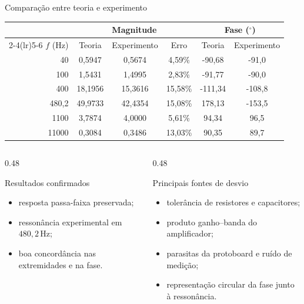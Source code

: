 \begin{frame}{Comparação entre teoria e experimento}
  \scriptsize
  \centering
  \begin{tabular}{rccccc}
    \toprule
    & \multicolumn{3}{c}{Magnitude} & \multicolumn{2}{c}{Fase ($^\circ$)} \\
    \cmidrule(lr){2-4}\cmidrule(lr){5-6}
    $f$ (Hz) & Teoria & Experimento & Erro & Teoria & Experimento \\
    \midrule
    40    & 0,5947  & 0,5674  & 4,59\%  & -90,68  & -91,0 \\
    100   & 1,5431  & 1,4995  & 2,83\%  & -91,77  & -90,0 \\
    400   & 18,1956 & 15,3616 & 15,58\% & -111,34 & -108,8 \\
    480,2 & 49,9733 & 42,4354 & 15,08\% & 178,13  & -153,5 \\
    1100  & 3,7874  & 4,0000  & 5,61\%  & 94,34   & 96,5 \\
    11000 & 0,3084  & 0,3486  & 13,03\% & 90,35   & 89,7 \\
    \bottomrule
  \end{tabular}

  \vspace{0.16cm}
  \begin{columns}[T,onlytextwidth]
    \begin{column}{0.48\textwidth}
      \begin{block}{Resultados confirmados}
        \begin{itemize}
          \item resposta passa-faixa preservada;
          \item ressonância experimental em $480{,}2\,\mathrm{Hz}$;
          \item boa concordância nas extremidades e na fase.
        \end{itemize}
      \end{block}
    \end{column}
    \begin{column}{0.48\textwidth}
      \begin{alertblock}{Principais fontes de desvio}
        \begin{itemize}
          \item tolerância de resistores e capacitores;
          \item produto ganho--banda do amplificador;
          \item parasitas da protoboard e ruído de medição;
          \item representação circular da fase junto à ressonância.
        \end{itemize}
      \end{alertblock}
    \end{column}
  \end{columns}
\end{frame}